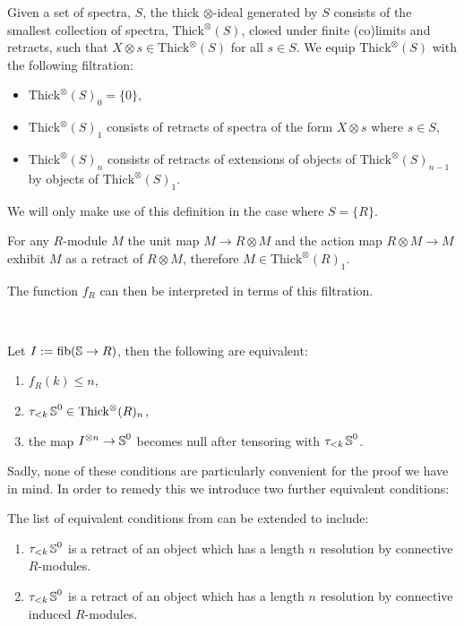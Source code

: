 \begin{dfn}
  Given a set of spectra, $S$, the thick $\otimes$-ideal generated by $S$ consists of the smallest collection of spectra, $\text{Thick}^{\otimes}(S)$, closed under finite (co)limits and retracts, such that $X \otimes s \in \text{Thick}^{\otimes}(S)$ for all $s \in S$. We equip $\text{Thick}^{\otimes}(S)$ with the following filtration:
  \begin{itemize}
  \item $\text{Thick}^{\otimes}(S)_0 = \{0\}$,
  \item $\text{Thick}^{\otimes}(S)_1$ consists of retracts of spectra of the form $X \otimes s$ where $s \in S$,
  \item $\text{Thick}^{\otimes}(S)_n$ consists of retracts of extensions of objects of $\text{Thick}^{\otimes}(S)_{n-1}$ by objects of $\text{Thick}^{\otimes}(S)_1$.
  \end{itemize}
  We will only make use of this definition in the case where $S = \{R\}$.
\end{dfn}

\begin{rmk}
  For any $R$-module $M$ the unit map $M \to R \otimes M$ and the action map $R \otimes M \to M$ exhibit $M$ as a retract of $R \otimes M$, therefore $M \in \text{Thick}^\otimes(R)_1$.
\end{rmk}

The function $f_R$ can then be interpreted in terms of this filtration. 

\begin{prop}
  \label{prop:f-interpret-I}\ 
  
  Let $I := \mathrm{fib}(\operatorname{\mathbb{S}} \to R)$, then the following are equivalent:
  \begin{enumerate}
  \item $f_R(k) \leq n$,
  \item $\tau_{<k}\operatorname{\mathbb{S}}^0 \in \textup{Thick}^{\otimes}(R)_n$,
  \item the map $I^{\otimes n} \to \operatorname{\mathbb{S}}^0$ becomes null after tensoring with $\tau_{<k}\operatorname{\mathbb{S}}^0$.
    \setcounter{fint}{\value{enumi}}    
  \end{enumerate}
\end{prop}

Sadly, none of these conditions are particularly convenient for the proof we have in mind. In order to remedy this we introduce two further equivalent conditions:

\begin{prop}
  \label{prop:f-interpret-II}
  The list of equivalent conditions from  can be extended to include:
  \begin{enumerate}
    \setcounter{enumi}{\value{fint}}
  \item $\tau_{<k}\operatorname{\mathbb{S}}^0$ is a retract of an object which has a length $n$ resolution by connective $R$-modules.
  \item $\tau_{<k}\operatorname{\mathbb{S}}^0$ is a retract of an object which has a length $n$ resolution by connective induced $R$-modules.
  \end{enumerate}
\end{prop}

